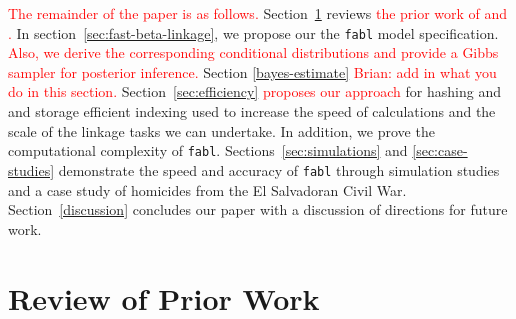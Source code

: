 \documentclass[12pt,letterpaper]{article}
\newcommand{\1}[1]{\mathbb{I}\!\left[#1\right]} %
\begin{document}
	\textcolor{red}{The remainder of the paper is as follows.} Section~\ref{sec:review-of_prior-work} reviews \textcolor{red}{the prior work of \cite{fellegi_theory_1969} and \cite{sadinle_bayesian_2017}.} In section~\ref{sec:fast-beta-linkage}, we propose our the \texttt{fabl} model specification. \textcolor{red}{Also, we derive the corresponding conditional distributions and provide a Gibbs sampler for posterior inference.}  Section \ref{bayes-estimate} \textcolor{red}{Brian: add in what you do in this section.}
	Section~\ref{sec:efficiency} \textcolor{red}{proposes our approach} for hashing and  and storage efficient indexing used to increase the speed of calculations and the scale of the linkage tasks we can undertake. In addition, we prove the computational complexity of \texttt{fabl}. Sections~\ref{sec:simulations} and \ref{sec:case-studies} demonstrate the speed and accuracy of \texttt{fabl} through simulation studies and a case study of homicides from the El Salvadoran Civil War. Section~\ref{discussion} concludes our paper with a discussion of directions for future work. 
	

	
%	
	

\section{Review of Prior Work}
\label{sec:review-of_prior-work}
\end{document}
